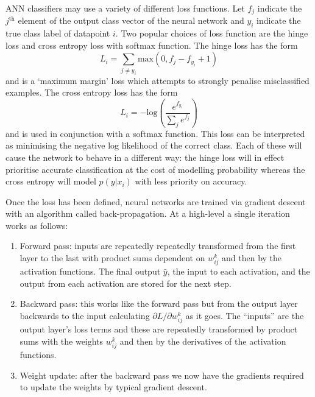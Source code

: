 ANN classifiers may use a variety of different loss functions. 
Let $f_{j}$ indicate the $j^{\mathrm{th}}$ element of the output class vector of the neural network and $y_{i}$ indicate the true class label of datapoint $i$. 
Two popular choices of loss function are the hinge loss and cross entropy loss with softmax function.
The hinge loss has the form
\begin{equation}
    L_{i} = \sum_{j\neq{}y_{i}}\mathrm{max}(0,f_{j}-f_{y_{i}} + 1)
\end{equation}
and is a `maximum margin' loss which attempts to strongly penalise misclassified examples. 
The cross entropy loss has the form
\begin{equation}
    L_{i} = -\mathrm{log}\left(
        \frac{e^{f_{y_{i}}}}
        {\sum_{j}e^{f_{j}}}\right)
\end{equation}
and is used in conjunction with a softmax function. This loss can be interpreted as minimising the negative log likelihood of the correct class.
Each of these will cause the network to behave in a different way: the hinge loss will in effect prioritise accurate classification at the cost of modelling probability whereas the cross entropy will model $p(y|x_{i})$ with less priority on accuracy.

Once the loss has been defined, neural networks are trained via gradient descent with an algorithm called back-propagation. At a high-level a single iteration works as follows:
\begin{enumerate}[leftmargin=.5in,noitemsep]
    \item Forward pass: inputs are repeatedly repeatedly transformed from the first layer to the last with product sums dependent on $w_{ij}^{k}$ and then by the activation functions. The final output $\hat{y}$, the input to each activation, and the output from each activation are stored for the next step. 
    \item Backward pass: this works like the forward pass but from the output layer backwards to the input calculating $\partial{L}/\partial{w_{ij}^{k}}$ as it goes. The ``inputs'' are the output layer's loss terms and these are repeatedly transformed by product sums with the weights $w_{ij}^{k}$ and then by the derivatives of the activation functions.  
    \item Weight update: after the backward pass we now have the gradients required to update the weights by typical gradient descent.
\end{enumerate}


